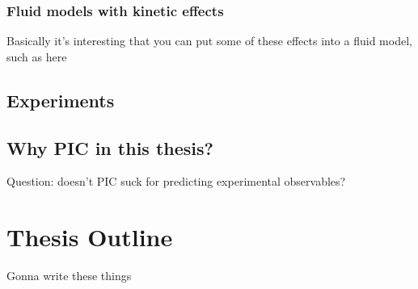 \subsubsection{Fluid models with kinetic effects}
Basically it's interesting that you can put some of these effects into a fluid model, such as here \citep{Tran2020}
\subsection{Experiments}

\subsection{Why PIC in this thesis?}
Question: doesn't PIC suck for predicting experimental observables? 

\section{Thesis Outline}
Gonna write these things

%
%
